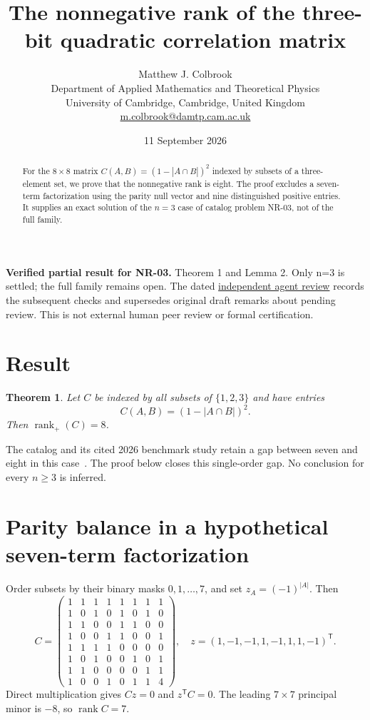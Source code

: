 \documentclass[11pt]{article}
\title{The nonnegative rank of the three-bit quadratic correlation matrix}
\author{Matthew J. Colbrook\\\small Department of Applied Mathematics and Theoretical Physics\\\small University of Cambridge, Cambridge, United Kingdom\\\small\href{mailto:m.colbrook@damtp.cam.ac.uk}{m.colbrook@damtp.cam.ac.uk}}\date{11 September 2026}
\newtheorem{theorem}{Theorem}
\newcommand{\rank}{\operatorname{rank}}
\begin{document}
\maketitle

\noindent\textbf{Verified partial result for NR-03.} Theorem 1 and Lemma 2. Only n=3 is settled; the full family remains open.
The dated \href{https://github.com/MColbrook/OpenProblemsInNLA/blob/codex/colbrook-factorization-resolutions/references/colbrook-factorization-2026-09-11/verification/reviews/NR-03-review.md}{independent agent review} records the subsequent checks and supersedes original draft remarks about pending review. This is not external human peer review or formal certification.
\par\medskip

\begin{abstract}
For the $8\times8$ matrix $C(A,B)=(1-|A\cap B|)^2$ indexed by subsets of a three-element set, we prove that the nonnegative rank is eight. The proof excludes a seven-term factorization using the parity null vector and nine distinguished positive entries. It supplies an exact solution of the $n=3$ case of catalog problem NR-03, not of the full family.
\end{abstract}

\section{Result}
\begin{theorem}\label{thm:main}
Let $C$ be indexed by all subsets of $\{1,2,3\}$ and have entries
\[
 C(A,B)=(1-|A\cap B|)^2.
\]
Then $\rank_+(C)=8$.
\end{theorem}
The catalog and its cited 2026 benchmark study retain a gap between seven and eight in this case~\cite{catalog,bvg}. The proof below closes this single-order gap. No conclusion for every $n\geq3$ is inferred.

\section{Parity balance in a hypothetical seven-term factorization}
Order subsets by their binary masks $0,1,\ldots,7$, and set $z_A=(-1)^{|A|}$. Then
\[
 C=\begin{pmatrix}
1&1&1&1&1&1&1&1\\
1&0&1&0&1&0&1&0\\
1&1&0&0&1&1&0&0\\
1&0&0&1&1&0&0&1\\
1&1&1&1&0&0&0&0\\
1&0&1&0&0&1&0&1\\
1&1&0&0&0&0&1&1\\
1&0&0&1&0&1&1&4
\end{pmatrix},\quad
 z=(1,-1,-1,1,-1,1,1,-1)^{\mathsf T}.
\]
Direct multiplication gives $Cz=0$ and $z^{\mathsf T}C=0$. The leading $7\times7$ principal minor is $-8$, so $\rank C=7$.
\end{document}
